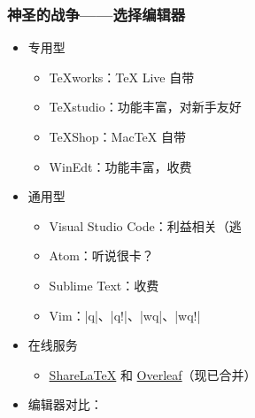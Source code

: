 \begin{frame}[fragile]
\frametitle{神圣的战争——选择编辑器}
\begin{itemize}
  \item<+-> 专用型

    \begin{itemize}
      \item TeXworks：\TeX{} Live 自带 \faWindows{} \faApple{} \faLinux{}
      \item TeXstudio：功能丰富，对新手友好 \faWindows{} \faApple{} \faLinux{}
      \item TeXShop：Mac\TeX{} 自带 \faApple{}
      \item WinEdt：功能丰富，收费 \faWindows{}
    \end{itemize}

  \item<+-> 通用型

    \begin{itemize}
      \item Visual Studio Code：利益相关（逃
      \item Atom：听说很卡？
      \item Sublime Text：收费
      \item Vim：|q|、|q!|、|wq|、|wq!|
    \end{itemize}

  \item<+-> 在线服务

    \begin{itemize}
      \item \href{https://www.sharelatex.com}{\textcolor{酡红}{ShareLaTeX}} 和
            \href{https://www.overleaf.com}{\textcolor{松花绿}{Overleaf}}（现已合并）
    \end{itemize}

  \item<+-> 编辑器对比：
\end{itemize}
\end{frame}
